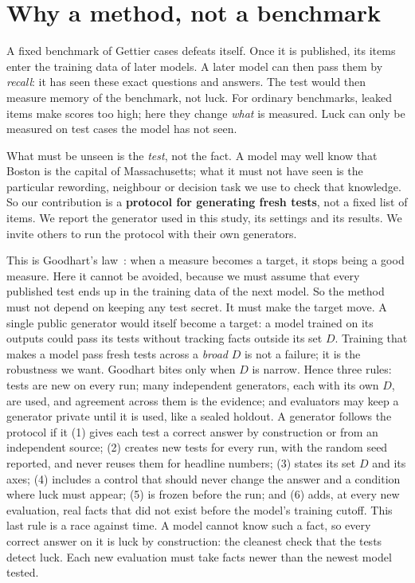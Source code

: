 \documentclass[10pt]{article}
\begin{document}
\section{Why a method, not a benchmark}
A fixed benchmark of Gettier cases defeats itself. Once it is published, its items enter the training data of later models. A later model can then pass them by \emph{recall}: it has seen these exact questions and answers. The test would then measure memory of the benchmark, not luck. For ordinary benchmarks, leaked items make scores too high; here they change \emph{what} is measured. Luck can only be measured on test cases the model has not seen.

What must be unseen is the \emph{test}, not the fact. A model may well know that Boston is the capital of Massachusetts; what it must not have seen is the particular rewording, neighbour or decision task we use to check that knowledge. So our contribution is a \textbf{protocol for generating fresh tests}, not a fixed list of items. We report the generator used in this study, its settings and its results. We invite others to run the protocol with their own generators.

This is Goodhart's law~\cite{goodhart,strathern,manheim}: when a measure becomes a target, it stops being a good measure. Here it cannot be avoided, because we must assume that every published test ends up in the training data of the next model. So the method must not depend on keeping any test secret. It must make the target move. A single public generator would itself become a target: a model trained on its outputs could pass its tests without tracking facts outside its set $D$. Training that makes a model pass fresh tests across a \emph{broad} $D$ is not a failure; it is the robustness we want. Goodhart bites only when $D$ is narrow. Hence three rules: tests are new on every run; many independent generators, each with its own $D$, are used, and agreement across them is the evidence; and evaluators may keep a generator private until it is used, like a sealed holdout. A generator follows the protocol if it (1) gives each test a correct answer by construction or from an independent source; (2) creates new tests for every run, with the random seed reported, and never reuses them for headline numbers; (3) states its set $D$ and its axes; (4) includes a control that should never change the answer and a condition where luck must appear; (5) is frozen before the run; and (6) adds, at every new evaluation, real facts that did not exist before the model's training cutoff. This last rule is a race against time. A model cannot know such a fact, so every correct answer on it is luck by construction: the cleanest check that the tests detect luck. Each new evaluation must take facts newer than the newest model tested.
\end{document}
